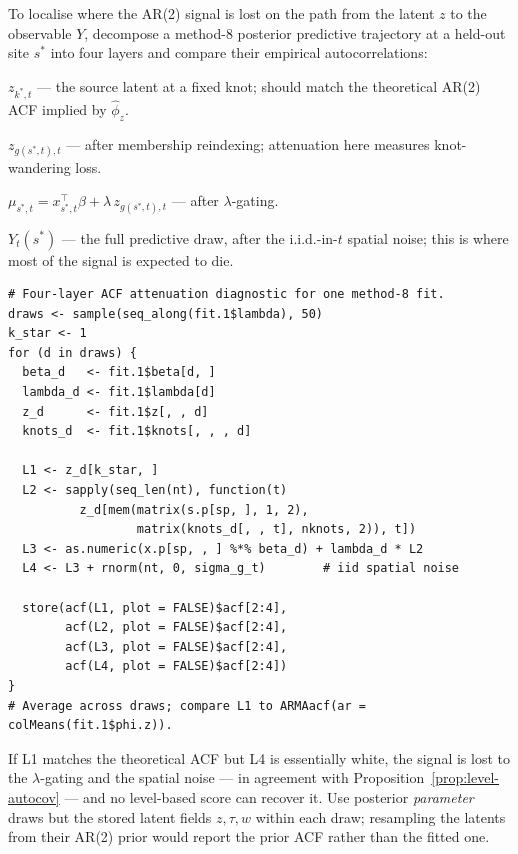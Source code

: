 \documentclass[11pt]{article}
\theoremstyle{definition}
\begin{document}
To localise where the AR(2) signal is lost on the path from the latent
$z$ to the observable $Y$, decompose a method-8 posterior predictive
trajectory at a held-out site $s^*$ into four layers and compare their
empirical autocorrelations:
\begin{description}[leftmargin=2.6em, itemsep=2pt]
  \item[\textnormal{L1}] $z_{k^\ast,t}$ --- the source latent at a fixed
        knot; should match the theoretical AR(2) ACF implied by
        $\hat\phi_z$.
  \item[\textnormal{L2}] $z_{g(s^*,t),t}$ --- after membership
        reindexing; attenuation here measures knot-wandering loss.
  \item[\textnormal{L3}] $\mu_{s^*,t} = x_{s^*,t}^\top\beta +
        \lambda\,z_{g(s^*,t),t}$ --- after $\lambda$-gating.
  \item[\textnormal{L4}] $Y_t(s^*)$ --- the full predictive draw, after
        the i.i.d.-in-$t$ spatial noise; this is where most of the
        signal is expected to die.
\end{description}

\begin{lstlisting}
# Four-layer ACF attenuation diagnostic for one method-8 fit.
draws <- sample(seq_along(fit.1$lambda), 50)
k_star <- 1
for (d in draws) {
  beta_d   <- fit.1$beta[d, ]
  lambda_d <- fit.1$lambda[d]
  z_d      <- fit.1$z[, , d]
  knots_d  <- fit.1$knots[, , , d]

  L1 <- z_d[k_star, ]
  L2 <- sapply(seq_len(nt), function(t)
          z_d[mem(matrix(s.p[sp, ], 1, 2),
                  matrix(knots_d[, , t], nknots, 2)), t])
  L3 <- as.numeric(x.p[sp, , ] %*% beta_d) + lambda_d * L2
  L4 <- L3 + rnorm(nt, 0, sigma_g_t)        # iid spatial noise

  store(acf(L1, plot = FALSE)$acf[2:4],
        acf(L2, plot = FALSE)$acf[2:4],
        acf(L3, plot = FALSE)$acf[2:4],
        acf(L4, plot = FALSE)$acf[2:4])
}
# Average across draws; compare L1 to ARMAacf(ar = colMeans(fit.1$phi.z)).
\end{lstlisting}

If L1 matches the theoretical ACF but L4 is essentially white, the
signal is lost to the $\lambda$-gating and the spatial noise --- in
agreement with Proposition~\ref{prop:level-autocov} --- and no
level-based score can recover it. Use posterior \emph{parameter} draws
but the stored latent fields $z,\tau,w$ within each draw; resampling
the latents from their AR(2) prior would report the prior ACF rather
than the fitted one.
\end{document}
